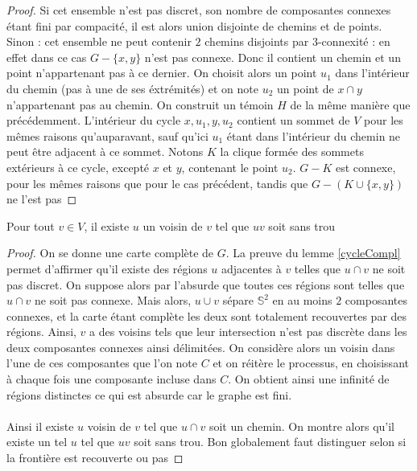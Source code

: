 \documentclass{scrartcl}
\begin{document}
\begin{flushleft}
\begin{proof}
    Si cet ensemble n'est pas discret, son nombre de composantes connexes étant fini par compacité, il est alors union disjointe de chemins
    et de points.\\
    Sinon : cet ensemble ne peut contenir $2$ chemins disjoints par $3$-connexité : en effet dans ce cas $G - \{x, y\}$ n'est pas connexe.
    Donc il contient un chemin et un point n'appartenant pas à ce dernier. On choisit alors un point $u_1$ dans l'intérieur du chemin (pas à une
    de ses éxtrémités) et on note $u_2$ un point de $x \cap y$ n'appartenant pas au chemin. On construit un témoin $H$ de la même manière que précédemment.
    L'intérieur du cycle $x, u_1, y, u_2$ contient un sommet de $V$ pour les mêmes raisons qu'auparavant, sauf qu'ici $u_1$ étant dans l'intérieur
    du chemin ne peut être adjacent à ce sommet. Notons $K$ la clique formée des sommets extérieurs à ce cycle, excepté $x$ et $y$, contenant le point $u_2$.
    $G - K$ est connexe, pour les mêmes raisons que pour le cas précédent, tandis que $G - (K \cup \{x, y\})$ ne l'est pas
\end{proof}

\begin{lem}
    Pour tout $v \in V$, il existe $u$ un voisin de $v$ tel que $uv$ soit sans trou
\end{lem}

\begin{proof}
    On se donne une carte complète de $G$. La preuve du lemme \ref{cycleCompl} permet d'affirmer qu'il existe des régions $u$ adjacentes à $v$
    telles que $u \cap v$ ne soit pas discret. On suppose alors par l'absurde que toutes ces régions sont telles que $u \cap v$ ne soit
    pas connexe. Mais alors, $u \cup v$ sépare $\mathbb{S}^2$ en au moins $2$ composantes connexes, et la carte étant complète les deux sont totalement
    recouvertes par des régions. Ainsi, $v$ a des voisins tels que leur intersection n'est pas discrète dans les deux composantes connexes ainsi délimitées.
    On considère alors un voisin dans l'une de ces composantes que l'on note $C$ et on réitère le processus, en choisissant à chaque fois une composante incluse dans $C$.
    On obtient ainsi une infinité de régions distinctes ce qui est absurde car le graphe est fini.
    \\~\\
    Ainsi il existe $u$ voisin de $v$ tel que $u \cap v$ soit un chemin. On montre alors qu'il existe un tel $u$ tel que $uv$ soit sans trou.
    Bon globalement faut distinguer selon si la frontière est recouverte ou pas
\end{proof}


\end{flushleft}
\end{document}
